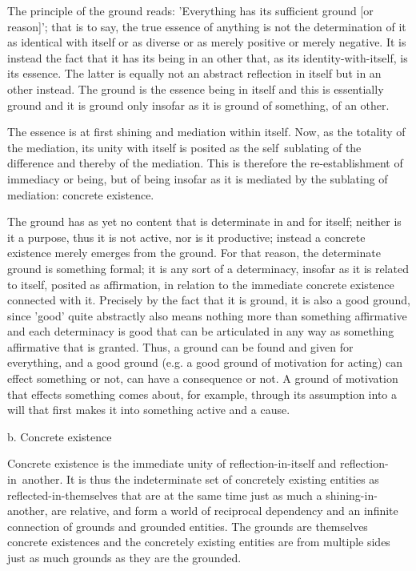     The principle of the ground reads:
    'Everything has its sufficient ground [or reason]';
    that is to say, the true essence of anything is not
    the determination of it as identical with itself or
    as diverse or as merely positive or merely negative.
    It is instead the fact that it has its being in an other that,
    as its identity-with-itself, is its essence.
    The latter is equally not an abstract reflection
    in itself but in an other instead.
    The ground is the essence being in itself and
    this is essentially ground and it is ground only
    insofar as it is ground of something, of an other.

The essence is at first shining and mediation within itself.
Now, as the totality of the mediation, its unity with itself is posited
as the self~sublating of the difference and thereby of the mediation.
This is therefore the re-establishment of immediacy or being,
but of being insofar as it is mediated by the sublating of mediation:
concrete existence.

    The ground has as yet no content that is determinate in and for itself;
    neither is it a purpose, thus it is not active, nor is it productive;
    instead a concrete existence merely emerges from the ground.
    For that reason, the determinate ground is something formal;
    it is any sort of a determinacy,
    insofar as it is related to itself, posited as affirmation,
    in relation to the immediate concrete existence connected with it.
    Precisely by the fact that it is ground, it is also a good ground,
    since 'good' quite abstractly also means nothing more than something
    affirmative and each determinacy is good that can be articulated in
    any way as something affirmative that is granted.
    Thus, a ground can be found and given for everything,
    and a good ground (e.g. a good ground of motivation for acting)
    can effect something or not, can have a consequence or not.
    A ground of motivation that effects something comes about,
    for example, through its assumption into a will that
    first makes it into something active and a cause.

b. Concrete existence

Concrete existence is the immediate unity of
reflection-in-itself and reflection-in~another.
It is thus the indeterminate set of concretely
existing entities as reflected-in-themselves
that are at the same time just as much
a shining-in-another, are relative, and
form a world of reciprocal dependency and
an infinite connection of grounds and grounded entities.
The grounds are themselves concrete existences and
the concretely existing entities are from multiple sides
just as much grounds as they are the grounded.

